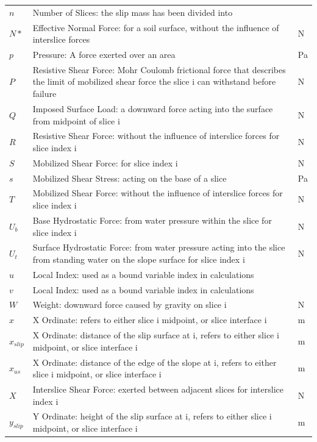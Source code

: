 \documentclass[12pt]{article}
\begin{document}
\begin{longtabu}{l X[l] l}
\\
$n$ & Number of Slices: the slip mass has been divided into & 
\\
$N*$ & Effective Normal Force: for a soil surface, without the influence of interslice forces & N
\\
$p$ & Pressure: A force exerted over an area & Pa
\\
$P$ & Resistive Shear Force: Mohr Coulomb frictional force that describes the limit of mobilized shear force the slice i can withstand before failure & N
\\
$Q$ & Imposed Surface Load: a downward force acting into the surface from midpoint of slice i & N
\\
$R$ & Resistive Shear Force: without the influence of interslice forces for slice index i & N
\\
$S$ & Mobilized Shear Force: for slice index i & N
\\
$s$ & Mobilized Shear Stress: acting on the base of a slice & Pa
\\
$T$ & Mobilized Shear Force: without the influence of interslice forces for slice index i & N
\\
${U_{b}}$ & Base Hydrostatic Force: from water pressure within the slice for slice index i & N
\\
${U_{t}}$ & Surface Hydrostatic Force: from water pressure acting into the slice from standing water on the slope surface for slice index i & N
\\
$u$ & Local Index: used as a bound variable index in calculations & 
\\
$v$ & Local Index: used as a bound variable index in calculations & 
\\
$W$ & Weight: downward force caused by gravity on slice i & N
\\
$x$ & X Ordinate: refers to either slice i midpoint, or slice interface i & m
\\
${x_{slip}}$ & X Ordinate: distance of the slip surface at i, refers to either slice i midpoint, or slice interface i & m
\\
${x_{us}}$ & X Ordinate: distance of the edge of the slope at i, refers to either slice i midpoint, or slice interface i & m
\\
$X$ & Interslice Shear Force: exerted between adjacent slices for interslice index i & N
\\
${y_{slip}}$ & Y Ordinate: height of the slip surface at i, refers to either slice i midpoint, or slice interface i & m
\\

\end{longtabu}
\end{document}

